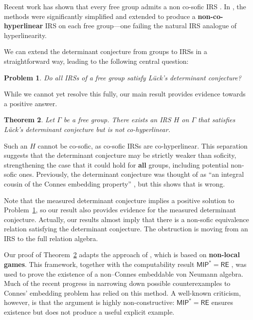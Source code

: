 \documentclass[pdflatex,sn-mathphys-num]{sn-jnl}%
\newtheorem{theorem}{Theorem}[section]
\newtheorem{problem}[theorem]{Problem}
\begin{document}
Recent work has shown that every free group admits a non co-sofic IRS \cite{bowen_aldous--lyons_2024,bowen_aldous--lyons_2024-1}.  
In \cite{manzoor_there_2025}, the methods were significantly simplified and extended to produce a \textbf{non-co-hyperlinear} IRS on each free group—one failing the natural IRS analogue of hyperlinearity.

We can extend the determinant conjecture from groups to IRSs in a straightforward way, leading to the following central question:

\begin{problem}\label{prob:1.2}
Do all IRSs of a free group satisfy L\"uck's determinant conjecture?
\end{problem}

While we cannot yet resolve this fully, our main result provides evidence towards a positive answer.

\begin{theorem}\label{thm:1.3}
Let $\Gamma$ be a free group. There exists an IRS $H$ on $\Gamma$ that satisfies L\"uck's determinant conjecture but is not co-hyperlinear.
\end{theorem}

Such an $H$ cannot be co-sofic, as co-sofic IRSs are co-hyperlinear.  
This separation suggests that the determinant conjecture may be strictly weaker than soficity, strengthening the case that it could hold for \textbf{all} groups, including potential non-sofic ones. Previously, the determinant conjecture was thought of as ``an integral cousin of the Connes embedding property'' \cite{lueck_l2-torsion_2010}, but this shows that is wrong.

Note that the measured determinant conjecture \cite{lueck_l2-torsion_2010} implies a positive solution to Problem~\ref{prob:1.2}, so our result also provides evidence for the measured determinant conjecture. Actually, our results almost imply that there is a non-sofic equivalence relation satisfying the determinant conjecture. The obstruction is moving from an IRS to the full relation algebra.


Our proof of Theorem~\ref{thm:1.3} adapts the approach of \cite{manzoor_there_2025}, which is based on \textbf{non-local games}.  
This framework, together with the computability result $\mathsf{MIP}^* = \mathsf{RE}$
 \cite{ji_mipre_2022}, was used to prove the existence of a non--Connes embeddable von Neumann algebra.  
Much of the recent progress in narrowing down possible counterexamples to Connes' embedding problem has relied on this method.  
A well-known criticism, however, is that the argument is highly non-constructive: $\mathsf{MIP}^* = \mathsf{RE}$
 ensures existence but does not produce a useful explicit example.
\end{document}
